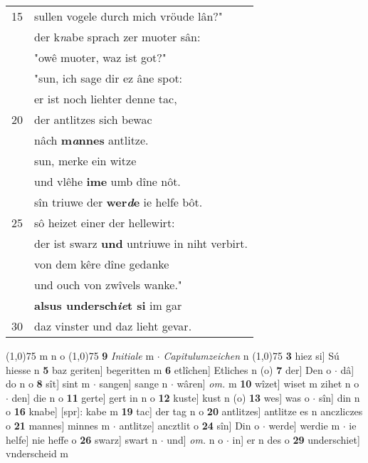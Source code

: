 \documentclass[8pt,a4paper,notitlepage]{article}
\begin{document}
\begin{table}[ht]
\begin{minipage}[t]{0.5\linewidth}
\begin{tabular}{rl}
15 & sullen vogele durch mich vröude lân?"\\ 
 & der k\textit{n}abe sprach zer muoter sân:\\ 
 & "owê muoter, waz ist got?"\\ 
 & "sun, ich sage dir ez âne spot:\\ 
 & er ist noch liehter denne tac,\\ 
20 & der antlitzes sich bewac\\ 
 & nâch \textbf{m\textit{a}nnes} antlitze.\\ 
 & sun, merke ein witze\\ 
 & und vlêhe \textbf{ime} umb dîne nôt.\\ 
 & sîn triuwe der \textbf{wer\textit{d}e} ie helfe bôt.\\ 
25 & sô heizet einer der hellewirt:\\ 
 & der ist swarz \textbf{und} untriuwe in niht verbirt.\\ 
 & von dem kêre dîne gedanke\\ 
 & und ouch von zwîvels wanke."\\ 
 & \textbf{alsus undersch\textit{ie}t si} im gar\\ 
30 & daz vinster und daz lieht gevar.\\ 
\end{tabular}
\scriptsize
\line(1,0){75} \newline
m n o \newline
\line(1,0){75} \newline
\textbf{9} \textit{Initiale} m   $\cdot$ \textit{Capitulumzeichen} n  \newline
\line(1,0){75} \newline
\textbf{3} hiez si] Sú hiesse n \textbf{5} baz geriten] begeritten m \textbf{6} etlîchen] Etliches n (o) \textbf{7} der] Den o  $\cdot$ dâ] do n o \textbf{8} sît] sint m  $\cdot$ sangen] sange n  $\cdot$ wâren] \textit{om.} m \textbf{10} wîzet] wiset m zihet n o  $\cdot$ den] die n o \textbf{11} gerte] gert in n o \textbf{12} kuste] kust n (o) \textbf{13} wes] was o  $\cdot$ sîn] din n o \textbf{16} knabe] [spr]: kabe m \textbf{19} tac] der tag n o \textbf{20} antlitzes] antlitze es n anczliczes o \textbf{21} mannes] minnes m  $\cdot$ antlitze] ancztlit o \textbf{24} sîn] Din o  $\cdot$ werde] werdie m  $\cdot$ ie helfe] nie heffe o \textbf{26} swarz] swart n  $\cdot$ und] \textit{om.} n o  $\cdot$ in] er n des o \textbf{29} underschiet] vnderscheid m \newline
\end{minipage}
\end{table}
\end{document}
